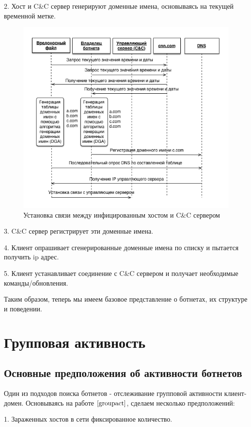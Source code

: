 \documentclass[a4paper,14pt]{extreport} %
\begin{document}
2. Хост и C\&C сервер генерируют доменные имена, основываясь на текущей временной метке.
\begin{figure}[H]
	\centering
	\includegraphics[scale=0.75]{communicate.png}
	\caption{Установка связи между инфицированным хостом и C\&C сервером}
	\label{fig:comn}
\end{figure}

	
3. C\&C сервер регистрирует эти доменные имена.
	
4. Клиент опрашивает сгенерированные доменные имена по списку и пытается получить ip адрес.
	
5. Клиент устанавливает соединение с C\&C сервером и получает необходимые команды/обновления.
	
Таким образом, теперь мы имеем базовое представление о ботнетах, их структуре и поведении.

\chapter{Групповая активность}
\label{chap:groupact}
\section{Основные предположения об активности ботнетов}
Один из подходов поиска ботнетов - отслеживание групповой активности клиент-домен. Основываясь на работе $\cite{groupact}$, сделаем несколько предположений:
	
1. Зараженных хостов в сети фиксированное количество.
	
\end{document}
